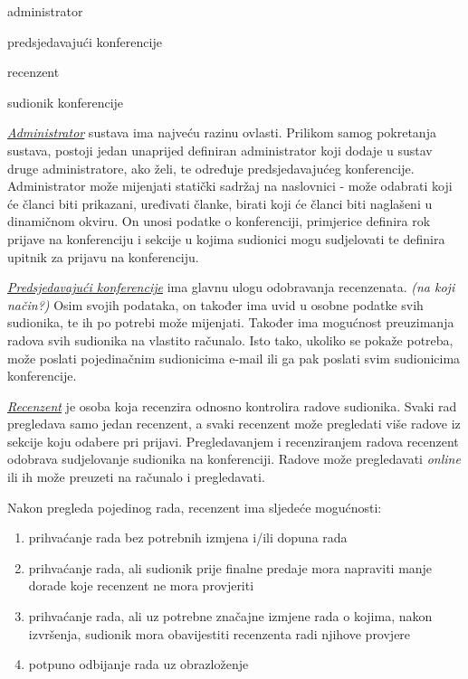 		\begin{packed_item}
			
			\item administrator
			\item predsjedavajući konferencije
			\item recenzent
			\item sudionik konferencije
			
		\end{packed_item}
	
		\underline{\textit{Administrator}} sustava ima najveću razinu ovlasti. Prilikom samog pokretanja sustava, postoji jedan unaprijed definiran administrator koji dodaje u sustav druge administratore, ako želi, te određuje predsjedavajućeg konferencije. Administrator može mijenjati statički sadržaj na naslovnici - može odabrati koji će članci biti prikazani, uređivati članke, birati koji će članci biti naglašeni u dinamičnom okviru. On unosi podatke o konferenciji, primjerice definira rok prijave na konferenciju i sekcije u kojima sudionici mogu sudjelovati te definira upitnik za prijavu na konferenciju.
		
		
		\underline{\textit{Predsjedavajući konferencije}} ima glavnu ulogu odobravanja recenzenata. \textit{(na koji način?)} Osim svojih podataka, on također ima uvid u osobne podatke svih sudionika, te ih po potrebi može mijenjati. Također ima mogućnost preuzimanja radova svih sudionika na vlastito računalo. Isto tako, ukoliko se pokaže potreba, može poslati pojedinačnim sudionicima e-mail ili ga pak poslati svim sudionicima konferencije. 
		
		
		\underline{\textit{Recenzent}} je osoba koja recenzira odnosno kontrolira radove sudionika. Svaki rad pregledava samo jedan recenzent, a svaki recenzent može pregledati više radove iz sekcije koju odabere pri prijavi. Pregledavanjem i recenziranjem radova recenzent odobrava sudjelovanje sudionika na konferenciji. Radove može pregledavati \textit{online} ili ih može preuzeti na računalo i pregledavati. 
		
		Nakon pregleda pojedinog rada, recenzent ima sljedeće mogućnosti:
		
		\begin{enumerate}
			
			\item prihvaćanje rada bez potrebnih izmjena i/ili dopuna rada
			\item prihvaćanje rada, ali sudionik prije finalne predaje mora napraviti manje dorade koje recenzent ne mora provjeriti
			\item prihvaćanje rada, ali uz potrebne značajne izmjene rada o kojima, nakon izvršenja, sudionik mora obavijestiti recenzenta radi njihove provjere
			\item potpuno odbijanje rada uz obrazloženje
			
		\end{enumerate}
	
